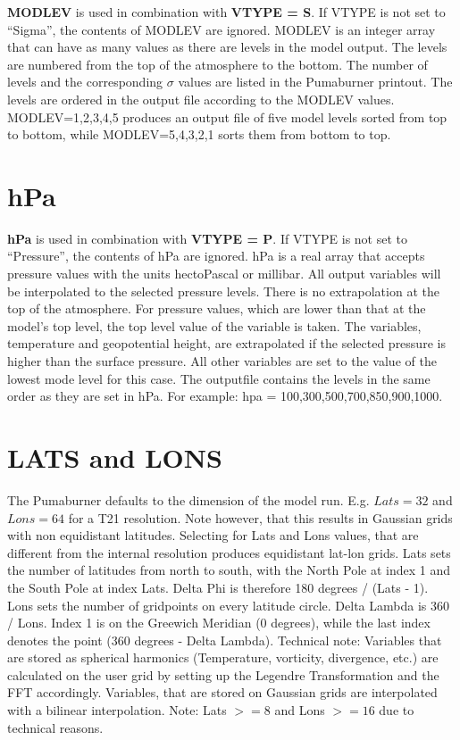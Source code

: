 {\bf MODLEV} is used in combination with {\bf VTYPE = S}.
If VTYPE is not set to ``Sigma'', the contents of MODLEV are ignored.
MODLEV is an integer array that can have as many values as there are
levels in the model output. The levels are numbered from the top of
the atmosphere to the bottom. The number of levels and the 
corresponding $\sigma$ values are listed in the Pumaburner printout.
The levels are ordered in the output file  according to the MODLEV values.
MODLEV=1,2,3,4,5 produces an output file of five model levels
sorted from top to bottom, while MODLEV=5,4,3,2,1 sorts them
from bottom to top.

\section{hPa}

{\bf hPa} is used in combination with {\bf VTYPE = P}.
If VTYPE is not set to ``Pressure'', the contents of hPa are ignored.
hPa is a real array that accepts pressure values with the
units hectoPascal or millibar. All output variables will be
interpolated to the selected pressure levels.
There is no extrapolation at the top of the atmosphere.
For pressure values, which are lower than that at the model's
top level, the top level value of the variable is taken.
The variables, temperature and geopotential height, are extrapolated
if the selected pressure is higher than the surface pressure.
All other variables are set to the value of the lowest mode level
for this case. The outputfile contains the levels in the same order
as they are set in hPa. For example: hpa = 100,300,500,700,850,900,1000.

\section{LATS and LONS}

        The Pumaburner defaults to the dimension of the model run.
        E.g. $Lats=32$ and $Lons=64$ for a T21 resolution.
        Note however, that this results in Gaussian grids with
        non equidistant latitudes.
        Selecting for Lats and Lons values, that are different from
        the internal resolution produces equidistant lat-lon grids.
        Lats sets the number of latitudes from north to south,
        with the North Pole at index 1 and the South Pole at index Lats.
        Delta Phi is therefore 180 degrees / (Lats - 1).
        Lons sets the number of gridpoints on every latitude circle.
        Delta Lambda is 360 / Lons.
        Index 1 is on the Greewich Meridian (0 degrees), while the last index
        denotes the point (360 degrees - Delta Lambda).
        Technical note:
           Variables that are stored as spherical harmonics
        (Temperature, vorticity, divergence, etc.) are calculated
        on the user grid by setting up the Legendre Transformation
        and the FFT accordingly. Variables, that are stored on
        Gaussian grids are interpolated with a bilinear interpolation.
        Note: Lats $>= 8$ and Lons $>= 16$ due to technical reasons.


